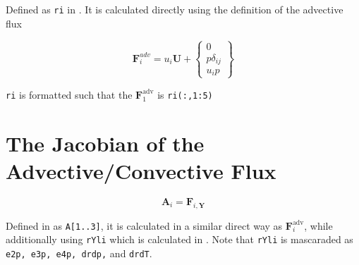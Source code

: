 \documentclass[12pt, letterpaper, twoside]{article}
\renewcommand{\vec}[1]{\bm{#1}}
\newcommand{\ttt}[1]{\texttt{#1}}
\newcommand{\U}{\vec{U}}
\newcommand{\A}{\vec{A}}
\newcommand{\F}{\vec{F}}
\newcommand{\0}{\vec{0}}
\begin{document}
    Defined as \ttt{ri} in . It is calculated directly using the definition of the advective flux

    \begin{equation}
        \F_i^{adv}  = 
        u_i \U
        + \begin{Bmatrix}
            0 \\
            p \delta_{ij}\\
            u_i p
        \end{Bmatrix} 
    \end{equation}

    \ttt{ri} is formatted such that the \(\F_1^{\text{adv}}\) is \ttt{ri(:,1:5)}

\section{The Jacobian of the Advective/Convective Flux}
    \begin{equation}
        \A_i = \F_{i,\vec{Y}}
    \end{equation}


    Defined in  as \ttt{A[1..3]}, it is calculated in a similar direct way as \(\F_i^{\text{adv}}\), while additionally using \ttt{rYli} which is calculated in . Note that \ttt{rYli} is mascaraded as \ttt{e2p, e3p, e4p, drdp,} and \ttt{drdT}.
\end{document}

